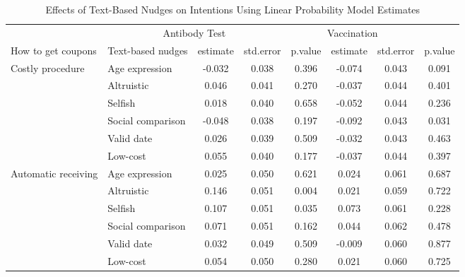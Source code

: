 \documentclass[
  11pt,
  a4paper,
]{article}
\begin{document}
\begin{table}

\caption{\label{tab:int-reg-ftest}Effects of Text-Based Nudges on Intentions Using Linear Probability Model Estimates}
\centering
\begin{tabular}[t]{>{\raggedright\arraybackslash}p{5em}lcccccc}
\toprule
\multicolumn{2}{c}{ } & \multicolumn{3}{c}{Antibody Test} & \multicolumn{3}{c}{Vaccination} \\
\cmidrule(l{3pt}r{3pt}){3-5} \cmidrule(l{3pt}r{3pt}){6-8}
How to get coupons & Text-based nudges & estimate & std.error & p.value & estimate  & std.error  & p.value \\
\midrule
Costly procedure & Age expression & -0.032 & 0.038 & 0.396 & -0.074 & 0.043 & 0.091\\
 & Altruistic & 0.046 & 0.041 & 0.270 & -0.037 & 0.044 & 0.401\\
 & Selfish & 0.018 & 0.040 & 0.658 & -0.052 & 0.044 & 0.236\\
 & Social comparison & -0.048 & 0.038 & 0.197 & -0.092 & 0.043 & 0.031\\
 & Valid date & 0.026 & 0.039 & 0.509 & -0.032 & 0.043 & 0.463\\
 & Low-cost & 0.055 & 0.040 & 0.177 & -0.037 & 0.044 & 0.397\\
Automatic receiving & Age expression & 0.025 & 0.050 & 0.621 & 0.024 & 0.061 & 0.687\\
 & Altruistic & 0.146 & 0.051 & 0.004 & 0.021 & 0.059 & 0.722\\
 & Selfish & 0.107 & 0.051 & 0.035 & 0.073 & 0.061 & 0.228\\
 & Social comparison & 0.071 & 0.051 & 0.162 & 0.044 & 0.062 & 0.478\\
 & Valid date & 0.032 & 0.049 & 0.509 & -0.009 & 0.060 & 0.877\\
 & Low-cost & 0.054 & 0.050 & 0.280 & 0.021 & 0.060 & 0.725\\
\bottomrule
\end{tabular}
\end{table}
\end{document}
